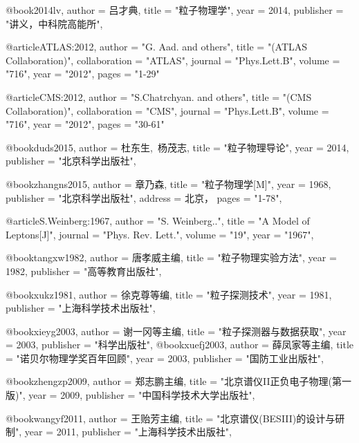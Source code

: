 @book{2014lv,
      author = {{吕才典}},
      title = "粒子物理学",
      year = {2014},
      publisher = "讲义，中科院高能所",
}

@article{ATLAS:2012,
      author         = "G. Aad. and others",
      title          = "{(ATLAS Collaboration)}",
      collaboration  = "ATLAS",
      journal        = "Phys.Lett.B",
      volume         = "716",
      year           = "2012",
      pages          = "1-29"
}

@article{CMS:2012,
      author         = "S.Chatrchyan. and others",
      title          = "{(CMS Collaboration)}",
      collaboration  = "CMS",
      journal        = "Phys.Lett.B",
      volume         = "716",
      year           = "2012",
      pages          = "30-61"
}

@book{duds2015,
      author = {{杜东生,~杨茂志}},
      title = "粒子物理导论",
      year = {2014},
      publisher = "北京科学出版社",
}

@book{zhangns2015,
      author = {{章乃森}},
      title = "粒子物理学[M]",
      year = {1968},
      publisher = "北京科学出版社",
      address =      {北京}，
      pages          = "1-78",
}

@article{S.Weinberg:1967,
      author         = "S. Weinberg..",
      title          = "{A Model of Leptons[J]}",
      journal        = "Phys. Rev. Lett.",
      volume         = "19",
      year           = "1967",
}

@book{tangxw1982,
      author = {{唐孝威主编}},
      title = "粒子物理实验方法",
      year = {1982},
      publisher = "高等教育出版社",
}

@book{xukz1981,
      author = {{徐克尊等编}},
      title = "粒子探测技术",
      year = {1981},
      publisher = "上海科学技术出版社",
}

@book{xieyg2003,
      author = {{谢一冈等主编}},
      title = "粒子探测器与数据获取",
      year = {2003},
      publisher = "科学出版社",
}
@book{xuefj2003,
      author = {{薛凤家等主编}},
      title = "诺贝尔物理学奖百年回顾",
      year = {2003},
      publisher = "国防工业出版社",
}

@book{zhengzp2009,
      author = {{郑志鹏主编}},
      title = "北京谱仪II正负电子物理(第一版)",
      year = {2009},
      publisher = "中国科学技术大学出版社",
}

@book{wangyf2011,
      author = {{王贻芳主编}},
      title = "北京谱仪(BESIII)的设计与研制",
      year = {2011},
      publisher = "上海科学技术出版社",
}

